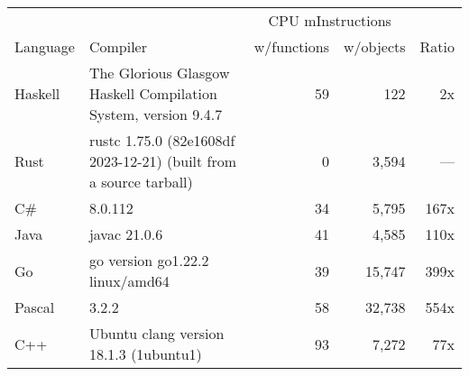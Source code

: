 \documentclass{article}
\begin{document}
      \begin{tabularx}{\linewidth}{lXrrr}
      \toprule
        & & \multicolumn{2}{c}{CPU mInstructions} & \\
        Language & Compiler & w/functions & w/objects & Ratio \\
      \midrule
    Haskell & The Glorious Glasgow Haskell Compilation System, version 9.4.7 & 59 & 122 & 2x \\
Rust & rustc 1.75.0 (82e1608df 2023-12-21) (built from a source tarball) & 0 & 3,594 & --- \\
C\# & 8.0.112 & 34 & 5,795 & 167x \\
Java & javac 21.0.6 & 41 & 4,585 & 110x \\
Go & go version go1.22.2 linux/amd64 & 39 & 15,747 & 399x \\
Pascal & 3.2.2 & 58 & 32,738 & 554x \\
C++ & Ubuntu clang version 18.1.3 (1ubuntu1) & 93 & 7,272 & 77x \\

      \bottomrule
      \end{tabularx}
      
\end{document}
